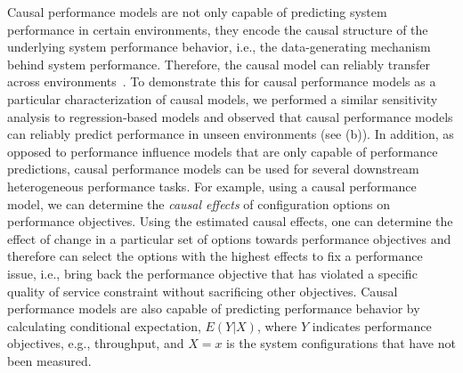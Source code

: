 Causal performance models are not only capable of predicting system performance in certain environments, they encode the causal structure of the underlying system performance behavior, i.e., the data-generating mechanism behind system performance. Therefore, the causal model can reliably transfer across environments~\cite{scholkopf2021toward}. To demonstrate this for causal performance models as a particular characterization of causal models, we performed a similar sensitivity analysis to regression-based models and observed that causal performance models can reliably predict performance in unseen environments (see  (b)). In addition, as opposed to performance influence models that are only capable of performance predictions, causal performance models can be used for several downstream heterogeneous performance tasks. For example, using a causal performance model, we can determine the \emph{causal effects} of configuration options on performance objectives. Using the estimated causal effects, one can determine the effect of change in a particular set of options towards performance objectives and therefore can select the options with the highest effects to fix a performance issue, i.e., bring back the performance objective that has violated a specific quality of service constraint without sacrificing other objectives. Causal performance models are also capable of predicting performance behavior by calculating conditional expectation, $E(Y|X)$, where $Y$ indicates performance objectives, e.g., throughput, and $X=x$ is the system configurations that have not been measured.


    

